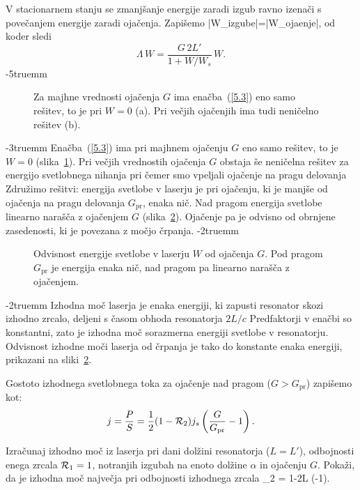 V stacionarnem stanju se zmanjšanje energije zaradi izgub ravno izenači 
s povečanjem energije zaradi ojačenja. Zapišemo
\beq
|\Delta W_{\rm izgube}|=|\Delta W_{\rm ojaenje}|,
\eeq
od koder sledi
\begin{equation}  
\Lambda\, W=\frac{G\,2L'}{1+W/W_s}\,W.
\label{5.3}
\end{equation}
\vglue-5truemm
\begin{figure}[ht]
\centering
\def\svgwidth{110truemm} 

\caption{Za majhne vrednosti ojačenja $G$ ima enačba~(\ref{5.3}) eno samo 
rešitev, to je pri $W=0$ (a). Pri večjih ojačenjih ima tudi neničelno rešitev (b).}
\label{fig:stacio}
\end{figure}
\vglue-3truemm
Enačba~(\ref{5.3}) ima pri majhnem ojačenju $G$ eno samo rešitev, to je 
$W=0$ (slika~\ref{fig:stacio}). Pri večjih vrednostih ojačenja $G$ obstaja še neničelna rešitev
za energijo svetlobnega nihanja 
pri čemer smo vpeljali ojačenje na pragu delovanja
Združimo rešitvi: energija svetlobe v laserju je pri ojačenju, ki je manjše
od ojačenja na pragu delovanja $G_\mathrm{pr}$, enaka
nič. Nad pragom energija svetlobe linearno narašča z ojačenjem $G$ (slika~\ref{fig:energija}).
Ojačenje pa je odvisno od obrnjene zasedenosti, ki je povezana
z močjo črpanja.
\vglue-2truemm
\begin{figure}[ht]
\centering
\def\svgwidth{60truemm} 

\caption{Odvisnost energije svetlobe v laserju $W$ od ojačenja $G$. 
Pod pragom $G_\mathrm{pr}$ je energija enaka nič, 
nad pragom pa linearno narašča z ojačenjem.}
\label{fig:energija}
\end{figure}
\vglue-2truemm
Izhodna moč laserja je enaka energiji, ki zapusti
resonator skozi izhodno zrcalo, deljeni s časom obhoda resonatorja $2L/c$ 
Predfaktorji v enačbi so konstantni, zato je izhodna moč sorazmerna
energiji svetlobe v resonatorju. Odvisnost izhodne moči laserja od črpanja je 
tako do konstante enaka energiji, prikazani na sliki~\ref{fig:energija}. 

Gostoto izhodnega svetlobnega toka za ojačenje nad pragom ($G>G_\mathrm{pr}$) 
zapišemo kot: 
\begin{equation}
 j = \frac{P}{S} = \frac{1}{2} (1-{\cal {R}}_{2}) j_s \left(\frac{G}{G_\mathrm{pr}}-1\right).
\end{equation}
\begin{naloga}
Izračunaj izhodno moč iz laserja pri dani dolžini resonatorja ($L=L'$), 
odbojnosti enega zrcala ${\cal {R}}_{1}=1$, 
notranjih izgubah na enoto dolžine $\alpha$ in ojačenju $G$. Pokaži, da
je izhodna moč največja pri odbojnosti izhodnega zrcala 
\beq
{}_2 = 1-2\alpha L \left(-1\right).
\eeq
\end{naloga}

